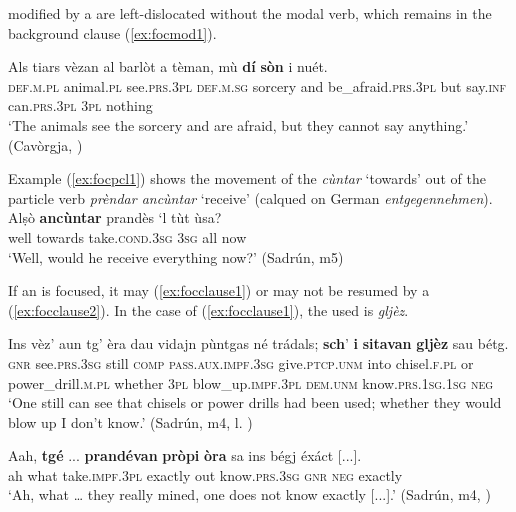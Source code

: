  modified by a  are left-dislocated without the modal verb, which remains in the background clause (\ref{ex:focmod1}).

\ea
\label{ex:focmod1}
\gll Als tiars vèzan al barlòt a tèman, mù \textbf{dí} \textbf{sòn} i nuét.\\
     \textsc{def.m.pl} animal.\textsc{pl} see.\textsc{prs.3pl} \textsc{def.m.sg} sorcery and be\_afraid.\textsc{prs.3pl} but say.\textsc{inf} can.\textsc{prs.3pl} \textsc{3pl} nothing\\
\glt `The animals see the sorcery and are afraid, but they cannot say anything.' (Cavòrgja, \citealt[125]{Büchli1966})
\z

Example (\ref{ex:focpcl1}) shows the movement of the  \textit{cùntar} `towards' out of the particle verb \textit{prèndar ancùntar} `receive' (calqued on German \textit{entgegennehmen}).
\ea
\label{ex:focpcl1}
\gll Alṣò \textbf{ancùntar} prandès `l tùt ùsa?\\
well towards take.\textsc{cond.3sg} \textsc{3sg} all	now\\
\glt `Well, would he receive everything now?' (Sadrún, m5)
\z

If an  is focused, it may (\ref{ex:focclause1}) or may not be resumed by a  (\ref{ex:focclause2}). In the case of (\ref{ex:focclause1}), the  used is \textit{gljèz}.

\ea
\label{ex:focclause1}
\gll Ins vèz’ aun tg’ èra dau vidajn pùntgas né trádals; \textbf{sch}’ \textbf{i} \textbf{sitavan} \textbf{gljèz} sau bétg.\\
\textsc{gnr} see.\textsc{prs.3sg} still \textsc{comp} \textsc{pass.aux.impf.3sg} give.\textsc{ptcp.unm} into chisel.\textsc{f.pl} or power\_drill.\textsc{m.pl} whether \textsc{3pl} blow\_up.\textsc{impf.3pl} \textsc{dem.unm} know.\textsc{prs.1sg.1sg}  \textsc{neg}\\
\glt `One still can see that chisels or power drills had been used; whether they would blow up I don’t know.' (Sadrún, m4, l. )
\z

\ea
\label{ex:focclause2}
\gll   Aah, \textbf{tgé} ... \textbf{prandévan} \textbf{pròpi} \textbf{òra} sa ins bégj éxáct [...]. \\
ah what {} take.\textsc{impf.3pl} exactly out know.\textsc{prs.3sg} \textsc{gnr} \textsc{neg} exactly\\
\glt `Ah, what … they really mined, one does not know exactly [...].' (Sadrún, m4, )
\z

